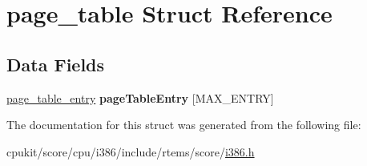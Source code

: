 \hypertarget{structpage__table}{}\section{page\+\_\+table Struct Reference}
\label{structpage__table}
\subsection*{Data Fields}
\begin{DoxyCompactItemize}
\item 
\mbox{\label{structpage__table_a47d3b45c32cf328464d9204ab910ddf7}} 
\mbox{\hyperlink{unionpage__table__entry}{page\+\_\+table\+\_\+entry}} {\bfseries page\+Table\+Entry} \mbox{[}M\+A\+X\+\_\+\+E\+N\+T\+RY\mbox{]}
\end{DoxyCompactItemize}


The documentation for this struct was generated from the following file\+:\begin{DoxyCompactItemize}
\item 
cpukit/score/cpu/i386/include/rtems/score/\mbox{\hyperlink{i386_8h}{i386.\+h}}\end{DoxyCompactItemize}
